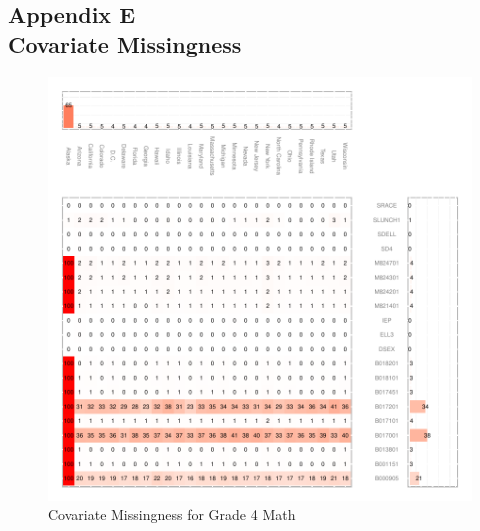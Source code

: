 \documentclass[letterpaper,12p,twoside]{article} %
\begin{document}
\clearpage
{}
\subsection*{Appendix E\\Covariate Missingness}
\label{appendixmissing}

\begin{figure}[h]
\begin{center}
\includegraphics[width=\textwidth]{../Figures2009/g4math-missing.pdf}
\caption{Covariate Missingness for Grade 4 Math}
\label{fig:g4math:missing}
\end{center}
\end{figure}
\end{document}
